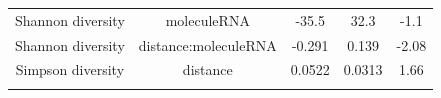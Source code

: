 \documentclass[]{article}
\begin{document}
\begin{longtable}[]{@{}ccccc@{}}
\begin{minipage}[t]{0.21\columnwidth}\centering\strut
Shannon diversity\strut
\end{minipage} & \begin{minipage}[t]{0.25\columnwidth}\centering\strut
moleculeRNA\strut
\end{minipage} & \begin{minipage}[t]{0.12\columnwidth}\centering\strut
-35.5\strut
\end{minipage} & \begin{minipage}[t]{0.14\columnwidth}\centering\strut
32.3\strut
\end{minipage} & \begin{minipage}[t]{0.14\columnwidth}\centering\strut
-1.1\strut
\end{minipage}\tabularnewline
\begin{minipage}[t]{0.21\columnwidth}\centering\strut
Shannon diversity\strut
\end{minipage} & \begin{minipage}[t]{0.25\columnwidth}\centering\strut
distance:moleculeRNA\strut
\end{minipage} & \begin{minipage}[t]{0.12\columnwidth}\centering\strut
-0.291\strut
\end{minipage} & \begin{minipage}[t]{0.14\columnwidth}\centering\strut
0.139\strut
\end{minipage} & \begin{minipage}[t]{0.14\columnwidth}\centering\strut
-2.08\strut
\end{minipage}\tabularnewline
\begin{minipage}[t]{0.21\columnwidth}\centering\strut
Simpson diversity\strut
\end{minipage} & \begin{minipage}[t]{0.25\columnwidth}\centering\strut
distance\strut
\end{minipage} & \begin{minipage}[t]{0.12\columnwidth}\centering\strut
0.0522\strut
\end{minipage} & \begin{minipage}[t]{0.14\columnwidth}\centering\strut
0.0313\strut
\end{minipage} & \begin{minipage}[t]{0.14\columnwidth}\centering\strut
1.66\strut
\end{minipage}\tabularnewline
\begin{minipage}[t]{0.21\columnwidth}\centering\strut

\end{minipage}
\end{longtable}
\end{document}
